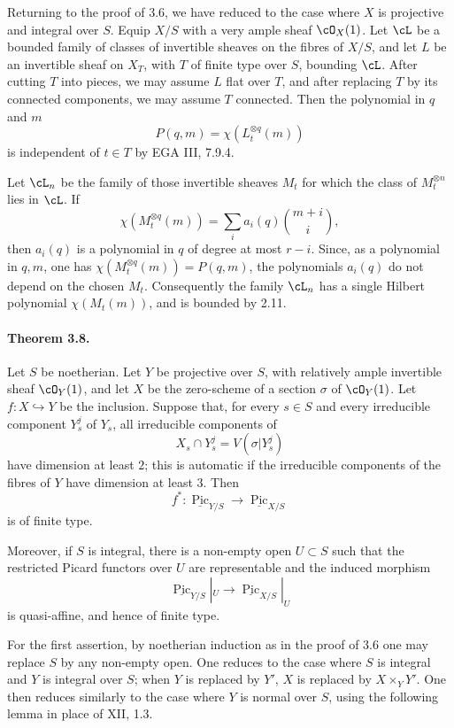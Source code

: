 \documentclass[11pt]{article}
\theoremstyle{plain}
\theoremstyle{definition}
\theoremstyle{remark}
\DeclareMathOperator{\Pic}{Pic}
\newcommand{\longto}{\longrightarrow}
\begin{document}
Returning to the proof of 3.6, we have reduced to the case where $X$ is projective and integral over $S$. Equip $X/S$ with a very ample sheaf $\cO_X(1)$. Let $\cL$ be a bounded family of classes of invertible sheaves on the fibres of $X/S$, and let $L$ be an invertible sheaf on $X_T$, with $T$ of finite type over $S$, bounding $\cL$. After cutting $T$ into pieces, we may assume $L$ flat over $T$, and after replacing $T$ by its connected components, we may assume $T$ connected. Then the polynomial in $q$ and $m$
\[
P(q,m)=\chi(L_t^{\otimes q}(m))
\]
is independent of $t\in T$ by EGA III, 7.9.4.

Let $\cL_n$ be the family of those invertible sheaves $M_t$ for which the class of $M_t^{\otimes n}$ lies in $\cL$. If
\[
\chi(M_t^{\otimes q}(m))=\sum_i a_i(q)\binom{m+i}{i},
\]
then $a_i(q)$ is a polynomial in $q$ of degree at most $r-i$. Since, as a polynomial in $q,m$, one has $\chi(M_t^{\otimes q}(m))=P(q,m)$, the polynomials $a_i(q)$ do not depend on the chosen $M_t$. Consequently the family $\cL_n$ has a single Hilbert polynomial $\chi(M_t(m))$, and is bounded by 2.11.

\paragraph{Theorem 3.8.}
Let $S$ be noetherian. Let $Y$ be projective over $S$, with relatively ample invertible sheaf $\cO_Y(1)$, and let $X$ be the zero-scheme of a section $\sigma$ of $\cO_Y(1)$. Let $f:X\hookrightarrow Y$ be the inclusion. Suppose that, for every $s\in S$ and every irreducible component $Y_s^j$ of $Y_s$, all irreducible components of
\[
X_s\cap Y_s^j=V(\sigma|Y_s^j)
\]
have dimension at least $2$; this is automatic if the irreducible components of the fibres of $Y$ have dimension at least $3$. Then
\[
f^*:\underline{\Pic}_{Y/S}\longto \underline{\Pic}_{X/S}
\]
is of finite type.

Moreover, if $S$ is integral, there is a non-empty open $U\subset S$ such that the restricted Picard functors over $U$ are representable and the induced morphism
\[
\underline{\Pic}_{Y/S}|_U\longto\underline{\Pic}_{X/S}|_U
\]
is quasi-affine, and hence of finite type.

For the first assertion, by noetherian induction as in the proof of 3.6 one may replace $S$ by any non-empty open. One reduces to the case where $S$ is integral and $Y$ is integral over $S$; when $Y$ is replaced by $Y'$, $X$ is replaced by $X\times_Y Y'$. One then reduces similarly to the case where $Y$ is normal over $S$, using the following lemma in place of XII, 1.3.
\end{document}
